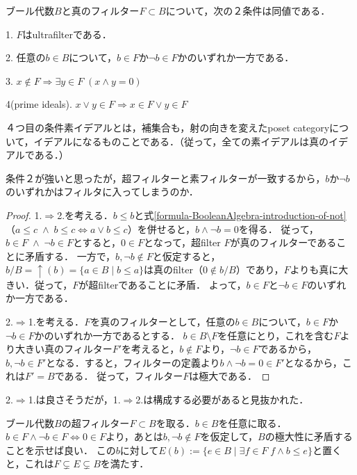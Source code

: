 \documentclass[uplatex, dvipdfmx]{jsarticle}
\begin{document}
\begin{proposition*}[ブール代数上のultrafilterの同値な条件]
    ブール代数$B$と真のフィルター$F\subset B$について，次の２条件は同値である．

    1. $F$はultrafilterである．

    2. 任意の$b\in B$について，$b\in F$か$\lnot b\in F$かのいずれか一方である．

    3. $x\notin F\Rightarrow \exists y\in F\; (x\land y=0)$

    4(prime ideals). $x\lor y\in F \Rightarrow x\in F \lor y\in F$
\end{proposition*}
\begin{remark*}
    ４つ目の条件素イデアルとは，補集合も，射の向きを変えたposet categoryについて，イデアルになるものことである．（従って，全ての素イデアルは真のイデアルである．）

    条件２が強いと思ったが，超フィルターと素フィルターが一致するから，$b$か$\lnot b$のいずれかはフィルタに入ってしまうのか．
\end{remark*}
\begin{proof}
    1.$\Rightarrow$2.を考える．$b\le b$と式\ref{formula-BooleanAlgebra-introduction-of-not}（$a\le c\;\land\; b\le c\Leftrightarrow a\lor b\le c$）を併せると，$b\land\lnot b=0$を得る．
    従って，$b\in F\;\land\; \lnot b\in F$とすると，$0\in F$となって，超filter $F$が真のフィルターであることに矛盾する．
    一方で，$b,\lnot b\notin F$と仮定すると，$b/B=\uparrow (b)=\{a\in B\mid b\le a\}$は真のfilter（$0\notin b/B$）であり，$F$よりも真に大きい．従って，$F$が超filterであることに矛盾．
    よって，$b\in F$と$\lnot b\in F$のいずれか一方である．
    
    2.$\Rightarrow$1.を考える．$F$を真のフィルターとして，任意の$b\in B$について，$b\in F$か$\lnot b\in F$かのいずれか一方であるとする．
    $b\in B\setminus F$を任意にとり，これを含む$F$より大きい真のフィルター$F'$を考えると，$b\notin F$より，$\lnot b\in F$であるから，$b,\lnot b\in F'$となる．すると，フィルターの定義より$b\land \lnot b=0\in F'$となるから，これは$F'=B$である．
    従って，フィルター$F$は極大である．
\end{proof}
\begin{remark*}
    2.$\Rightarrow$1.は良さそうだが，1.$\Rightarrow$2.は構成する必要があると見抜かれた．

    ブール代数$B$の超フィルター$F\subset B$を取る．$b\in B$を任意に取る．$b\in F\land\lnot b\in F\Leftrightarrow 0\in F$より，あとは$b,\lnot b\notin F$を仮定して，$B$の極大性に矛盾することを示せば良い．
    この$b$に対して$E(b):=\{e\in B\mid\exists f\in F\;f\land b\le e\}$と置くと，これは$F\subsetneq E\subsetneq B$を満たす．
\end{remark*}
\end{document}
